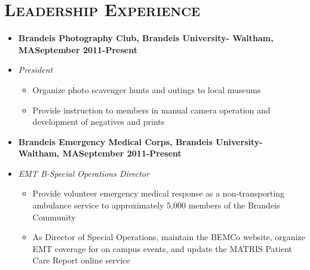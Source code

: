 \documentclass[11pt, oneside]{article}
\newcommand{\lr}[2]{#1\hfill#2}
\newenvironment{ressection}[1]{
  \section{\normalsize \scshape \selectfont #1 \normalfont}
  \vspace{-4pt}
  \begin{itemize} \itemsep-2pt
}{
  \end{itemize}
  \vspace{-20pt}
}
\newenvironment{resitem}[4]{
\item[] \lr{\bfseries \selectfont #1\normalfont, #2} {#3}
\item[] \textsl{#4}
  \vspace{-4pt}
  \begin{itemize} \itemsep-2pt
}{
  \end{itemize}
}
\begin{document}
\begin{ressection}{Leadership Experience}
  \begin{resitem}{Brandeis Photography Club}{Brandeis University- Waltham, MA}{September 2011-Present}{President}
  \item Organize photo scavenger hunts and outings to local museums
  \item Provide instruction to members in manual camera operation and development of negatives and prints
  \end{resitem}
  \begin{resitem}{Brandeis Emergency Medical Corps}{Brandeis University- Waltham, MA}{September 2011-Present}{EMT B-Special Operations Director}
  \item Provide volunteer emergency medical response as a non-transporting ambulance service to approximately 5,000 members of the Brandeis Community
  \item As Director of Special Operations, maintain the BEMCo website, organize EMT coverage for on campus events, and update the MATRIS Patient Care Report online service
  \end{resitem}
  \end{ressection}
\end{document}
